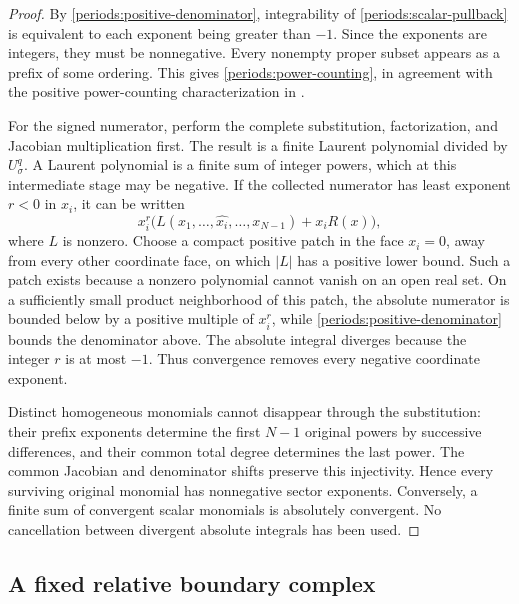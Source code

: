 \begin{proof}
By \eqref{periods:positive-denominator}, integrability of
\eqref{periods:scalar-pullback} is equivalent to each exponent being
greater than $-1$.  Since the exponents are integers, they must be
nonnegative.  Every nonempty proper subset appears as a prefix of some
ordering.  This gives \eqref{periods:power-counting}, in agreement with
the positive power-counting characterization in
\cite[Proposition~2.9]{panzer2023}.

For the signed numerator, perform the complete substitution, factorization,
and Jacobian multiplication first.  The result is a finite Laurent
polynomial divided by $U_\sigma^q$.  A Laurent polynomial is a finite
sum of integer powers, which at this intermediate stage may be negative.
If the collected numerator has least exponent $r<0$ in $x_i$, it can be
written
\begin{equation}
 x_i^r\bigl(L(x_1,\ldots,\widehat{x_i},\ldots,x_{N-1})+x_i R(x)\bigr),
 \label{periods:leading-boundary}
\end{equation}
where $L$ is nonzero.  Choose a compact positive patch in the face $x_i=0$,
away from every other coordinate face, on which $|L|$ has a positive lower
bound.  Such a patch exists because a nonzero polynomial cannot vanish on
an open real set.  On a sufficiently small product neighborhood of this
patch, the absolute numerator is bounded below by a positive multiple of
$x_i^r$, while \eqref{periods:positive-denominator} bounds the denominator
above.  The absolute integral diverges because the integer $r$ is at most
$-1$.  Thus convergence removes every negative coordinate exponent.

Distinct homogeneous monomials cannot disappear through the substitution:
their prefix exponents determine the first $N-1$ original powers by
successive differences, and their common total degree determines the last
power.  The common Jacobian and denominator shifts preserve this
injectivity.  Hence every surviving original monomial has nonnegative
sector exponents.  Conversely, a finite sum of convergent scalar
monomials is absolutely convergent.  No cancellation between divergent
absolute integrals has been used.
\end{proof}

\subsection{A fixed relative boundary complex}
\label{periods:relative}

